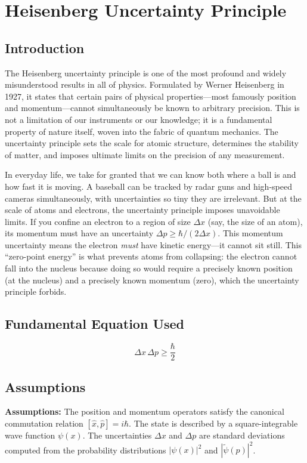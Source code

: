 \chapter{Heisenberg Uncertainty Principle}

\section*{Introduction}

The Heisenberg uncertainty principle is one of the most profound and widely misunderstood results in all of physics. Formulated by Werner Heisenberg in 1927, it states that certain pairs of physical properties---most famously position and momentum---cannot simultaneously be known to arbitrary precision. This is not a limitation of our instruments or our knowledge; it is a fundamental property of nature itself, woven into the fabric of quantum mechanics. The uncertainty principle sets the scale for atomic structure, determines the stability of matter, and imposes ultimate limits on the precision of any measurement.

In everyday life, we take for granted that we can know both where a ball is and how fast it is moving. A baseball can be tracked by radar guns and high-speed cameras simultaneously, with uncertainties so tiny they are irrelevant. But at the scale of atoms and electrons, the uncertainty principle imposes unavoidable limits. If you confine an electron to a region of size $\Delta x$ (say, the size of an atom), its momentum must have an uncertainty $\Delta p \geq \hbar/(2\Delta x)$. This momentum uncertainty means the electron \emph{must} have kinetic energy---it cannot sit still. This ``zero-point energy'' is what prevents atoms from collapsing: the electron cannot fall into the nucleus because doing so would require a precisely known position (at the nucleus) and a precisely known momentum (zero), which the uncertainty principle forbids.
\section*{Fundamental Equation Used}

\begin{equation}
\Delta x\,\Delta p \geq \frac{\hbar}{2}
\end{equation}
\section*{Assumptions}

\textbf{Assumptions:} The position and momentum operators satisfy the canonical commutation relation $[\hat{x},\hat{p}] = i\hbar$. The state is described by a square-integrable wave function $\psi(x)$. The uncertainties $\Delta x$ and $\Delta p$ are standard deviations computed from the probability distributions $|\psi(x)|^2$ and $|\tilde{\psi}(p)|^2$.


